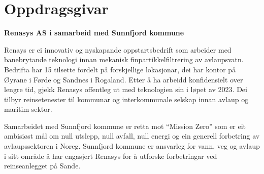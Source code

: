 \section{Oppdragsgivar}
\textbf{Renasys AS i samarbeid med Sunnfjord kommune}

Renays\citep{Renasys} er ei innovativ og nyskapande oppstartsbedrift som arbeider med banebrytande teknologi innan mekanisk finpartikkelfiltrering av avlaupsvatn.
Bedrifta har 15 tilsette fordelt på forskjellige lokasjonar, dei har kontor på Øyrane i Førde og Sandnes i Rogaland. 
Etter å ha arbeidd konfidensielt over lengre tid, gjekk Renasys offentleg ut med teknologien sin i løpet av 2023. 
Dei tilbyr reinsetenester til kommunar og interkommunale selskap innan avlaup og maritim sektor.

Samarbeidet med Sunnfjord kommune\citep{SunnfjordKommune} er retta mot ``Mission Zero'' som er eit ambisiøst mål om 
null utslepp, null avfall, null energi og ein generell forbetring av avlaupssektoren i Noreg. \newline
Sunnfjord kommune er ansvarleg for vann, veg og avlaup i sitt område å har engasjert 
Renasys for å utforske forbetringar ved reinseanlegget på Sande.
\newline
\newline


